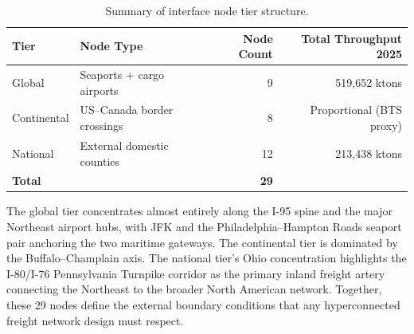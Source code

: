 \begin{table}[htbp]
\centering
\caption{Summary of interface node tier structure.}
\begin{tabular}{llrr}
\toprule
Tier & Node Type & Node Count & Total Throughput 2025 \\
\midrule
Global    & Seaports + cargo airports  & 9  & 519{,}652 ktons \\
Continental & US--Canada border crossings & 8  & Proportional (BTS proxy) \\
National  & External domestic counties & 12 & 213{,}438 ktons \\
\midrule
\textbf{Total} & & \textbf{29} & \\
\bottomrule
\end{tabular}
\label{tab:task2-summary}
\end{table}

The global tier concentrates almost entirely along the I-95 spine and the major Northeast
airport hubs, with JFK and the Philadelphia--Hampton Roads seaport pair anchoring the
two maritime gateways. The continental tier is dominated by the Buffalo--Champlain axis.
The national tier's Ohio concentration highlights the I-80/I-76 Pennsylvania Turnpike
corridor as the primary inland freight artery connecting the Northeast to the broader
North American network. Together, these 29 nodes define the external boundary conditions
that any hyperconnected freight network design must respect.
